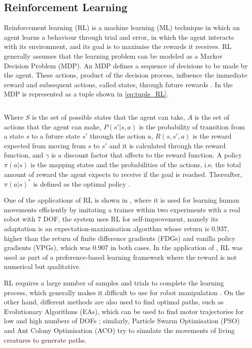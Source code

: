\documentclass[thesis]{mas_proposal}
\begin{document}
    \subsection{Reinforcement Learning}
    
    Reinforcement learning (RL) is a machine learning (ML) technique in which an agent learns a behaviour through trial and error, in which the agent interacts with its environment, and its goal is to maximise the rewards it receives. RL generally assumes that the learning problem can be modeled as a Markov Decision Problem (MDP). An MDP defines a sequence of decisions to be made by the agent. These actions, product of the decision process, influence the immediate reward and subsequent actions, called states, through future rewards \cite{Kaelbling1996, Brunke2022, Elguea2023}. In \cite{Elguea2023} the MDP is represented as a tuple shown in \ref{eq:tuple_RL}. 
    
    \begin{equation}
    [S, A, P(s'|s, a), R(s, s', a), \gamma]
    \label{eq:tuple_RL}
    \end{equation}
    
    Where $S$ is the set of possible states that the agent can take, $A$ is the set of actions that the agent can make, $P(s'|s, a)$ is the probability of transition from a state $s$ to a future state $s'$ through the action $a$, $R(s, s', a)$ is the reward expected from moving from $s$ to $s'$ and it is calculated through the reward function, and $\gamma$ is a discount factor that affects to the reward function. A policy $\pi(a|s)$ is the mapping states and the probabilities of the actions, i.e. the total amount of reward the agent expects to receive if the goal is reached. Thereafter, $\pi(a|s)^*$ is defined as the optimal policy \cite{Hussein2018, Elguea2023}. 
    
    One of the applications of RL is shown in \cite{Kober2010}, where it is used for learning human movements efficiently by imitating a trainer within two experiments with a real robot with 7 DOF, the system uses RL for self-improvement, namely its adaptation is an expectation-maximisation algorithm whose return is $0.937$, higher than the return of finite difference gradients (FDGs) and vanilla policy gradients (VPGs), which was 0.907 in both cases. In the application of \cite{Fuernkranz2012}, RL was used as part of a preference-based learning framework where the reward is not numerical but qualitative. 
    
    RL requires a large number of samples and trials to complete the learning process, which generally makes it difficult to use for robot manipulation \cite{Hua2021}. On the other hand, different methods are also used to find optimal paths, such as Evolutionary Algorithms (EAs), which can be used to find motor trajectories for low and high numbers of DOFs \cite{Nolfi2000}; similarly, Particle Swarm Optimisation (PSO) \cite{Zhang2015} and Ant Colony Optimisation (ACO) \cite{Zhang2010} try to simulate the movements of living creatures to generate paths.
    
\end{document}
